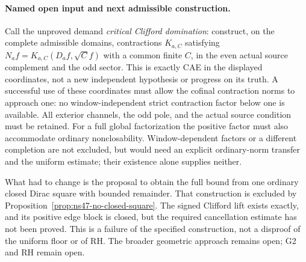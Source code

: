 \paragraph{Named open input and next admissible construction.}
Call the unproved demand \emph{critical Clifford domination}:
construct, on the complete admissible domains, contractions
$K_{a,C}$ satisfying $N_af=K_{a,C}(D_af,\sqrt C f)$ with a common
finite $C$, in the even actual source complement and the odd sector.
This is exactly CAE in the displayed coordinates, not a new independent
hypothesis or progress on its truth. A successful use of these
coordinates must allow the cofinal contraction norms to approach one:
no window-independent strict contraction factor below one is available.
All exterior channels, the odd pole, and the actual source condition
must be retained. For a full global
factorization the positive factor must also accommodate ordinary
nonclosability. Window-dependent factors or a different completion
are not excluded, but would need an explicit ordinary-norm transfer
and the uniform estimate; their existence alone supplies neither.

What had to change is the proposal to obtain the full bound from one
ordinary closed Dirac square with bounded remainder. That construction
is excluded by Proposition~\ref{prop:ns47-no-closed-square}. The signed
Clifford lift exists exactly, and its positive edge block is closed,
but the required cancellation estimate has not been proved. This is
a failure of the specified construction, not a disproof of the
uniform floor or of RH. The broader geometric approach remains open;
G2 and RH remain open.
